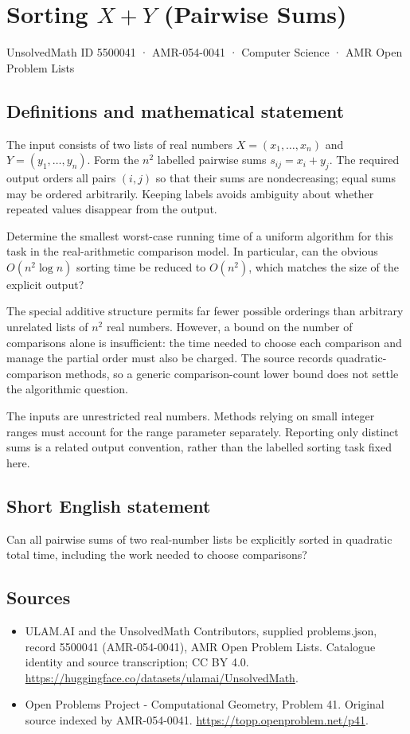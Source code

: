 \documentclass[11pt,a4paper]{article}
\begin{document}
\section*{Sorting $X+Y$ (Pairwise Sums)}\label{5500041}
{\small UnsolvedMath ID 5500041 · AMR-054-0041 · Computer Science · AMR Open Problem Lists}
\subsection{Definitions and mathematical statement}
The input consists of two lists of real numbers
$X=(x_1,\ldots,x_n)$ and $Y=(y_1,\ldots,y_n)$. Form the $n^2$ labelled
pairwise sums $s_{ij}=x_i+y_j$. The required output orders all pairs
$(i,j)$ so that their sums are nondecreasing; equal sums may be
ordered arbitrarily. Keeping labels avoids ambiguity about whether
repeated values disappear from the output.

Determine the smallest worst-case running time of a uniform algorithm
for this task in the real-arithmetic comparison model. In particular,
can the obvious $O(n^2\log n)$ sorting time be reduced to $O(n^2)$,
which matches the size of the explicit output?

The special additive structure permits far fewer possible orderings
than arbitrary unrelated lists of $n^2$ real numbers. However, a
bound on the number of comparisons alone is insufficient: the time
needed to choose each comparison and manage the partial order must
also be charged. The source records quadratic-comparison methods,
so a generic comparison-count lower bound does not settle the
algorithmic question.

The inputs are unrestricted real numbers. Methods relying on small
integer ranges must account for the range parameter separately.
Reporting only distinct sums is a related output convention, rather
than the labelled sorting task fixed here.
\subsection{Short English statement}
Can all pairwise sums of two real-number lists be explicitly sorted
in quadratic total time, including the work needed to choose comparisons?
\subsection{Sources}
\begin{itemize}
\item[S1] ULAM.AI and the UnsolvedMath Contributors, supplied problems.json, record 5500041 (AMR-054-0041), AMR Open Problem Lists. Catalogue identity and source transcription; CC BY 4.0.
\url{https://huggingface.co/datasets/ulamai/UnsolvedMath}.
\item[S2] Open Problems Project - Computational Geometry, Problem 41. Original source indexed by AMR-054-0041.
\url{https://topp.openproblem.net/p41}.
\end{itemize}
\end{document}
